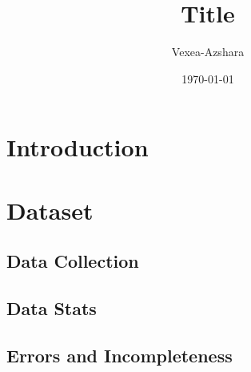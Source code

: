 \documentclass[letterpaper,12pt]{article}
\title{Title}
\author {Vexea-Azshara}
\date{\today}
\begin{document}
\maketitle

\tableofcontents
\newpage


\section{Introduction}

\section{Dataset}
\subsection{Data Collection}
\subsection{Data Stats}
\subsection{Errors and Incompleteness}
\end{document}
